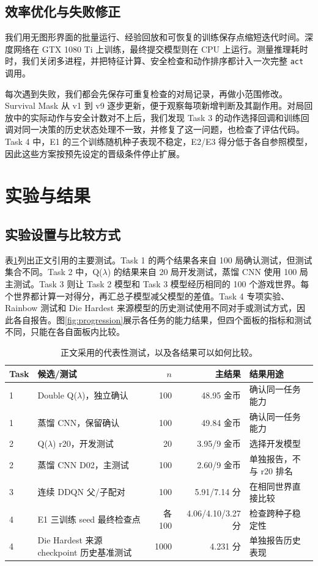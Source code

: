 \documentclass[UTF8,11pt,a4paper,fontset=none]{ctexart}
\begin{document}
\subsection{效率优化与失败修正}
我们用无图形界面的批量运行、经验回放和可恢复的训练保存点缩短迭代时间。深度网络在 GTX 1080 Ti 上训练，最终提交模型则在 CPU 上运行。测量推理耗时时，我们关闭多进程，并把特征计算、安全检查和动作排序都计入一次完整 \texttt{act} 调用。

每次遇到失败，我们都会先保存可重复检查的对局记录，再做小范围修改。Survival Mask 从 v1 到 v9 逐步更新，便于观察每项新增判断及其副作用。对局回放中的实际动作与安全计数对不上后，我们发现 Task 3 的动作选择回调和训练回调对同一决策的历史状态处理不一致，并修复了这一问题，也检查了评估代码。Task 4 中，E1 的三个训练随机种子表现不稳定，E2/E3 得分低于各自参照模型，因此这些方案按预先设定的晋级条件停止扩展。

\section{实验与结果}
\label{sec:results}
\subsection{实验设置与比较方式}
表\ref{tab:protocol}列出正文引用的主要测试。Task 1 的两个结果各来自 100 局确认测试，但测试集合不同。Task 2 中，Q($\lambda$) 的结果来自 20 局开发测试，蒸馏 CNN 使用 100 局主测试。Task 3 则让 Task 2 模型和 Task 3 模型经历相同的 100 个游戏世界。每个世界都计算一对得分，再汇总子模型减父模型的差值。Task 4 专项实验、Rainbow 测试和 Die Hardest 来源模型的历史测试使用不同对手或测试方式，因此各自报告。图\ref{fig:progression}展示各任务的能力结果，但四个面板的指标和测试不同，只能在各自面板内比较。

\begin{table}[H]\centering\small
\caption{正文采用的代表性测试，以及各结果可以如何比较。}\label{tab:protocol}
\begin{tabularx}{\linewidth}{lXrrl}\toprule
Task & 候选/测试 & $n$ & 主结果 & 结果用途\\\midrule
1 & Double Q($\lambda$)，独立确认 &100&48.95 金币&确认同一任务能力\\
1 & 蒸馏 CNN，保留确认 &100&49.84 金币&确认同一任务能力\\
2 & Q($\lambda$) r20，开发测试 &20&3.95/9 金币&选择开发模型\\
2 & 蒸馏 CNN D02，主测试 &100&2.60/9 金币&单独报告，不与 r20 排名\\
3 & 连续 DDQN 父/子配对 &100&5.91/7.14 分&在相同世界直接比较\\
4 & E1 三训练 seed 最终检查点 &各100&4.06/4.10/3.27 分&检查跨种子稳定性\\
4 & Die Hardest 来源 checkpoint 历史基准测试 &1000&4.231 分&单独报告历史表现\\\bottomrule
\end{tabularx}
\end{table}
\end{document}
